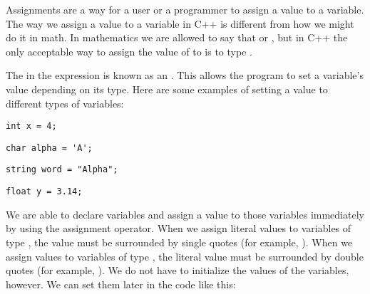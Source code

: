 

Assignments are a way for a user or a programmer to assign a value to a variable. 
The way we assign a value to a variable in C++ is different from how we might do it in math. 
In mathematics we are allowed to say that  or , but in C++ the only acceptable way to assign the value of  to  is to type . 

The \Code{=} in the expression  is known as an . 
This allows the program to set a variable's value depending on its type. 
Here are some examples of setting a value to different types of variables:

\noindent\begin{minipage}{\linewidth}\begin{lstlisting}
int x = 4;
\end{lstlisting}\end{minipage}

\noindent\begin{minipage}{\linewidth}\begin{lstlisting}
char alpha = 'A';
\end{lstlisting}\end{minipage}

\noindent\begin{minipage}{\linewidth}\begin{lstlisting}
string word = "Alpha";
\end{lstlisting}\end{minipage}

\noindent\begin{minipage}{\linewidth}\begin{lstlisting}
float y = 3.14;
\end{lstlisting}\end{minipage}

We are able to declare variables and assign a value to those variables immediately by using the assignment operator. 
When we assign literal values to variables of type , the value must be surrounded by single quotes (for example, ). 
When we assign values to variables of type , the literal value must be surrounded by double quotes (for example, ). 
We do not have to initialize the values of the variables, however. 
We can set them later in the code like this:


